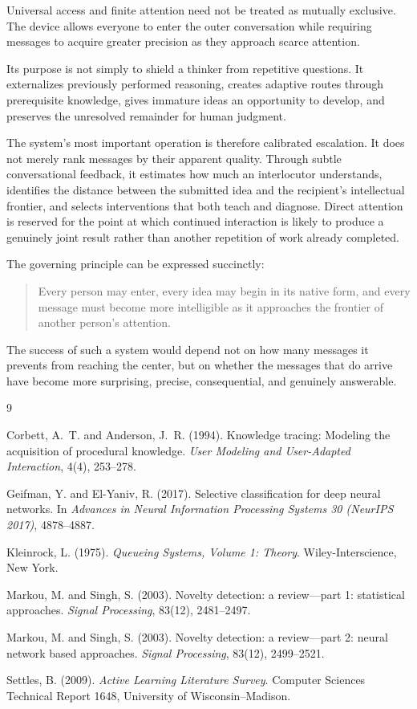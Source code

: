 \documentclass[11pt]{article}
\begin{document}
Universal access and finite attention need not be treated as mutually exclusive. The device allows everyone to enter the outer conversation while requiring messages to acquire greater precision as they approach scarce attention.

Its purpose is not simply to shield a thinker from repetitive questions. It externalizes previously performed reasoning, creates adaptive routes through prerequisite knowledge, gives immature ideas an opportunity to develop, and preserves the unresolved remainder for human judgment.

The system's most important operation is therefore calibrated escalation. It does not merely rank messages by their apparent quality. Through subtle conversational feedback, it estimates how much an interlocutor understands, identifies the distance between the submitted idea and the recipient's intellectual frontier, and selects interventions that both teach and diagnose. Direct attention is reserved for the point at which continued interaction is likely to produce a genuinely joint result rather than another repetition of work already completed.

The governing principle can be expressed succinctly:

\begin{quote}
Every person may enter, every idea may begin in its native form, and every message must become more intelligible as it approaches the frontier of another person's attention.
\end{quote}

The success of such a system would depend not on how many messages it prevents from reaching the center, but on whether the messages that do arrive have become more surprising, precise, consequential, and genuinely answerable.

\begin{thebibliography}{9}

Corbett, A.~T. and Anderson, J.~R. (1994). Knowledge tracing: Modeling the acquisition of procedural knowledge. \textit{User Modeling and User-Adapted Interaction}, 4(4), 253--278.

Geifman, Y. and El-Yaniv, R. (2017). Selective classification for deep neural networks. In \textit{Advances in Neural Information Processing Systems 30 (NeurIPS 2017)}, 4878--4887.

Kleinrock, L. (1975). \textit{Queueing Systems, Volume 1: Theory}. Wiley-Interscience, New York.

Markou, M. and Singh, S. (2003). Novelty detection: a review---part 1: statistical approaches. \textit{Signal Processing}, 83(12), 2481--2497.

Markou, M. and Singh, S. (2003). Novelty detection: a review---part 2: neural network based approaches. \textit{Signal Processing}, 83(12), 2499--2521.

Settles, B. (2009). \textit{Active Learning Literature Survey}. Computer Sciences Technical Report 1648, University of Wisconsin--Madison.

\end{thebibliography}
\end{document}
